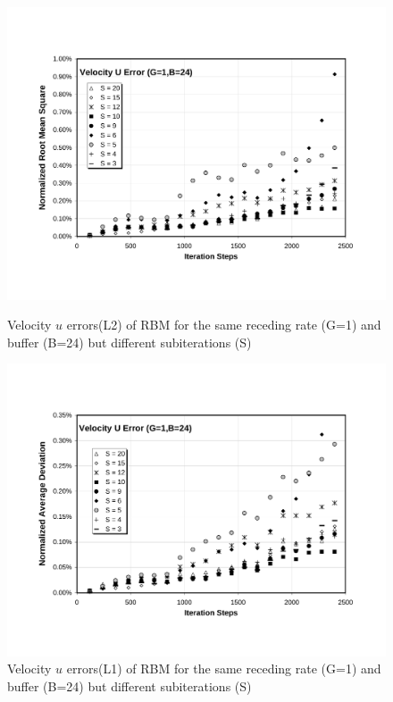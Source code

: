 \cp

\begin{figure}[htbp]
  \begin{center}
\includegraphics[scale=0.6]{../figures/Exp3-CASE1-dt0.005/G_1_B_24/G1-B24-U-NRMS.pdf}
    \caption{Velocity $u$ errors(L2) of RBM for the same receding rate (G=1) and buffer (B=24) but different subiterations (S)}
        \vspace{0.5in}
\includegraphics[scale=0.6]{../figures/Exp3-CASE1-dt0.005/G_1_B_24/G1-B24-U-NAD.pdf}
    \caption{Velocity $u$ errors(L1) of RBM for the same receding rate (G=1) and buffer (B=24) but different subiterations (S)}
  \end{center}
\end{figure}

